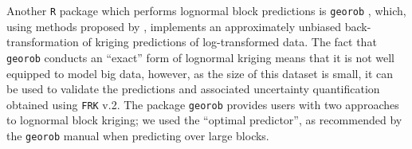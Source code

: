 \documentclass[12pt,a4paper]{article}
\begin{document}
Another \texttt{R} package which performs lognormal block predictions is \texttt{georob} \citep{georob}, which, using methods proposed by \cite{Cressie_2006_block_kriging_lognormal_spatial_processes}, implements an approximately unbiased back-transformation of kriging predictions of log-transformed data. 
The fact that \texttt{georob} conducts an ``exact'' form of lognormal kriging means that it is not well equipped to model big data, however, as the size of this dataset is small, it can be used to validate the predictions and associated uncertainty quantification obtained using \texttt{FRK} v.2. 
The package \texttt{georob} provides users with two approaches to lognormal block kriging; 
we used the ``optimal predictor'', as recommended by the \texttt{georob} manual when predicting over large blocks.
\end{document}
